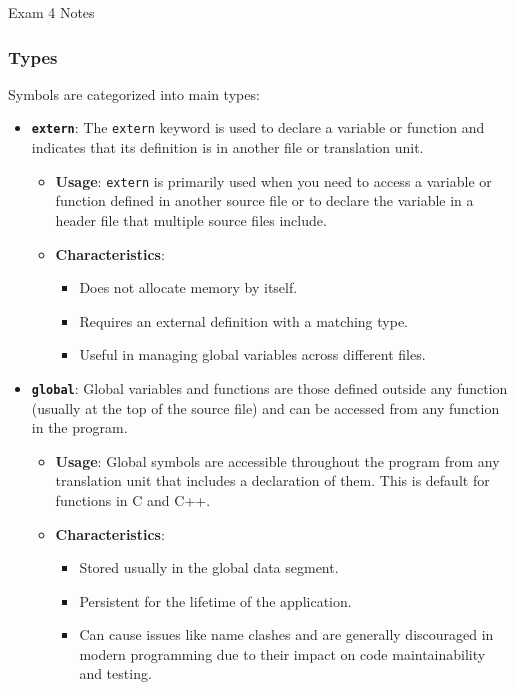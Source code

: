 \begin{examnotes}{Exam 4 Notes}
\begin{highlight}
        \subsubsection*{Types}

        Symbols are categorized into main types:

        \begin{itemize}
            \item \textbf{\texttt{extern}}: The \texttt{extern} keyword is used to declare a variable or function and indicates that its definition is in another file or translation unit.
            \begin{itemize}
                \item \textbf{Usage}: \texttt{extern} is primarily used when you need to access a variable or function defined in another source file or to declare the variable in a header file that 
                multiple source files include.
                \item \textbf{Characteristics}:
                \begin{itemize}
                    \item Does not allocate memory by itself.
                    \item Requires an external definition with a matching type.
                    \item Useful in managing global variables across different files.
                \end{itemize}
            \end{itemize}
            \item \textbf{\texttt{global}}: Global variables and functions are those defined outside any function (usually at the top of the source file) and can be accessed from any function in the program.
            \begin{itemize}
                \item \textbf{Usage}: Global symbols are accessible throughout the program from any translation unit that includes a declaration of them. This is default for functions in C and C++.
                \item \textbf{Characteristics}:
                \begin{itemize}
                    \item Stored usually in the global data segment.
                    \item Persistent for the lifetime of the application.
                    \item Can cause issues like name clashes and are generally discouraged in modern programming due to their impact on code maintainability and testing.

\end{itemize}
\end{itemize}
\end{itemize}
\end{highlight}
\end{examnotes}
